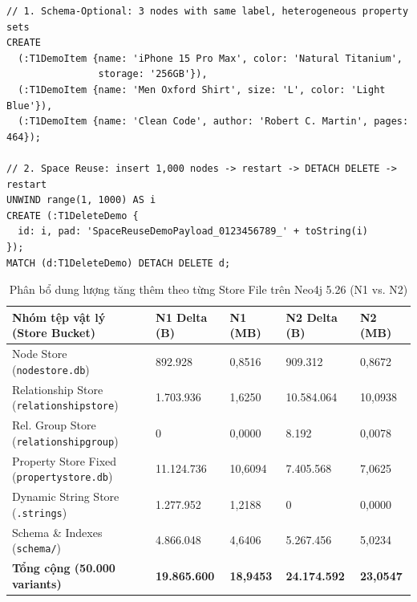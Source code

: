 \begin{lstlisting}[language={}, caption={Kiểm chứng Schema-Optional và thí nghiệm Space Reuse trên Neo4j 5}, label={lst:t1_neo_demo}, morekeywords={CREATE,UNWIND,range,toString,MATCH,DETACH,DELETE}, sensitive=false, morecomment={[l]{//}}, morestring={[b]'}]
// 1. Schema-Optional: 3 nodes with same label, heterogeneous property sets
CREATE
  (:T1DemoItem {name: 'iPhone 15 Pro Max', color: 'Natural Titanium',
                storage: '256GB'}),
  (:T1DemoItem {name: 'Men Oxford Shirt', size: 'L', color: 'Light Blue'}),
  (:T1DemoItem {name: 'Clean Code', author: 'Robert C. Martin', pages: 464});

// 2. Space Reuse: insert 1,000 nodes -> restart -> DETACH DELETE -> restart
UNWIND range(1, 1000) AS i
CREATE (:T1DeleteDemo {
  id: i, pad: 'SpaceReuseDemoPayload_0123456789_' + toString(i)
});
MATCH (d:T1DeleteDemo) DETACH DELETE d;
\end{lstlisting}

\begin{table}[htbp]
  \centering
  \footnotesize
  \setlength{\tabcolsep}{4pt}
  \renewcommand{\arraystretch}{1.25}
  \setlength{\emergencystretch}{2em}
  \caption{Phân bổ dung lượng tăng thêm theo từng Store File trên Neo4j 5.26 (N1 vs. N2)}
  \label{tab:t1_neo4j_stores}
  \begin{tabular}{|p{5.2cm}|p{1.9cm}|p{1.5cm}|p{1.9cm}|p{1.5cm}|}
    \hline
    \textbf{Nhóm tệp vật lý (Store Bucket)} & \textbf{N1 Delta (B)} & \textbf{N1 (MB)} & \textbf{N2 Delta (B)} & \textbf{N2 (MB)} \\
    \hline
    Node Store (\texttt{nodestore.db})               &    892.928 &  0,8516 &    909.312 &  0,8672 \\ \hline
    Relationship Store (\texttt{relationshipstore})  &  1.703.936 &  1,6250 & 10.584.064 & 10,0938 \\ \hline
    Rel. Group Store (\texttt{relationshipgroup})    &          0 &  0,0000 &      8.192 &  0,0078 \\ \hline
    Property Store Fixed (\texttt{propertystore.db}) & 11.124.736 & 10,6094 &  7.405.568 &  7,0625 \\ \hline
    Dynamic String Store (\texttt{.strings})         &  1.277.952 &  1,2188 &          0 &  0,0000 \\ \hline
    Schema \& Indexes (\texttt{schema/})             &  4.866.048 &  4,6406 &  5.267.456 &  5,0234 \\ \hline
    \textbf{Tổng cộng (50.000 variants)}             & \textbf{19.865.600} & \textbf{18,9453} & \textbf{24.174.592} & \textbf{23,0547} \\ \hline
  \end{tabular}
\end{table}


